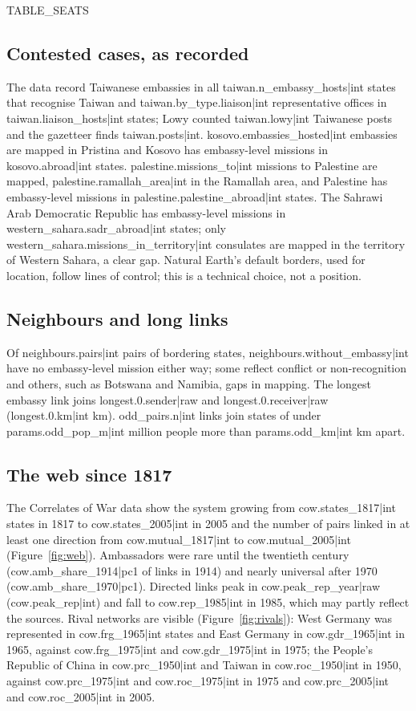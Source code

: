 \documentclass[11pt,a4paper]{article}
\begin{document}
{{TABLE_SEATS}}

\subsection{Contested cases, as recorded}
The data record Taiwanese embassies in all {{taiwan.n_embassy_hosts|int}} states that recognise Taiwan and {{taiwan.by_type.liaison|int}} representative offices in {{taiwan.liaison_hosts|int}} states; Lowy counted {{taiwan.lowy|int}} Taiwanese posts and the gazetteer finds {{taiwan.posts|int}}. {{kosovo.embassies_hosted|int}} embassies are mapped in Pristina and Kosovo has embassy-level missions in {{kosovo.abroad|int}} states. {{palestine.missions_to|int}} missions to Palestine are mapped, {{palestine.ramallah_area|int}} in the Ramallah area, and Palestine has embassy-level missions in {{palestine.palestine_abroad|int}} states. The Sahrawi Arab Democratic Republic has embassy-level missions in {{western_sahara.sadr_abroad|int}} states; only {{western_sahara.missions_in_territory|int}} consulates are mapped in the territory of Western Sahara, a clear gap. Natural Earth's default borders, used for location, follow lines of control; this is a technical choice, not a position.

\subsection{Neighbours and long links}
Of {{neighbours.pairs|int}} pairs of bordering states, {{neighbours.without_embassy|int}} have no embassy-level mission either way; some reflect conflict or non-recognition and others, such as Botswana and Namibia, gaps in mapping. The longest embassy link joins {{longest.0.sender|raw}} and {{longest.0.receiver|raw}} ({{longest.0.km|int}} km). {{odd_pairs.n|int}} links join states of under {{params.odd_pop_m|int}} million people more than {{params.odd_km|int}} km apart.

\subsection{The web since 1817}
The Correlates of War data show the system growing from {{cow.states_1817|int}} states in 1817 to {{cow.states_2005|int}} in 2005 and the number of pairs linked in at least one direction from {{cow.mutual_1817|int}} to {{cow.mutual_2005|int}} (Figure~\ref{fig:web}). Ambassadors were rare until the twentieth century ({{cow.amb_share_1914|pc1}} of links in 1914) and nearly universal after 1970 ({{cow.amb_share_1970|pc1}}). Directed links peak in {{cow.peak_rep_year|raw}} ({{cow.peak_rep|int}}) and fall to {{cow.rep_1985|int}} in 1985, which may partly reflect the sources. Rival networks are visible (Figure~\ref{fig:rivals}): West Germany was represented in {{cow.frg_1965|int}} states and East Germany in {{cow.gdr_1965|int}} in 1965, against {{cow.frg_1975|int}} and {{cow.gdr_1975|int}} in 1975; the People's Republic of China in {{cow.prc_1950|int}} and Taiwan in {{cow.roc_1950|int}} in 1950, against {{cow.prc_1975|int}} and {{cow.roc_1975|int}} in 1975 and {{cow.prc_2005|int}} and {{cow.roc_2005|int}} in 2005.
\end{document}
